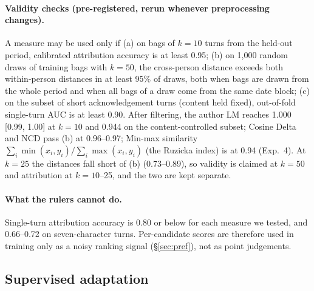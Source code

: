 \paragraph{Validity checks (pre-registered, rerun whenever preprocessing changes).}
A measure may be used only if (a) on bags of $k = 10$ turns from the held-out period, calibrated attribution accuracy is at least 0.95; (b) on 1,000 random draws of training bags with $k = 50$, the cross-person distance exceeds both within-person distances in at least 95\% of draws, both when bags are drawn from the whole period and when all bags of a draw come from the same date block; (c) on the subset of short acknowledgement turns (content held fixed), out-of-fold single-turn AUC is at least 0.90.
After filtering, the author LM reaches 1.000 [0.99, 1.00] at $k = 10$ and 0.944 on the content-controlled subset; Cosine Delta and NCD pass (b) at 0.96--0.97; Min-max similarity $\sum_i \min(x_i, y_i) / \sum_i \max(x_i, y_i)$ (the Ruzicka index) is at 0.94 (Exp.~4).
At $k = 25$ the distances fall short of (b) (0.73--0.89), so validity is claimed at $k = 50$ and attribution at $k = 10$--25, and the two are kept separate.

\paragraph{What the rulers cannot do.}
Single-turn attribution accuracy is 0.80 or below for each measure we tested, and 0.66--0.72 on seven-character turns.
Per-candidate scores are therefore used in training only as a noisy ranking signal (\S\ref{sec:pref}), not as point judgements.

\subsection{Supervised adaptation}
\label{sec:sft}

